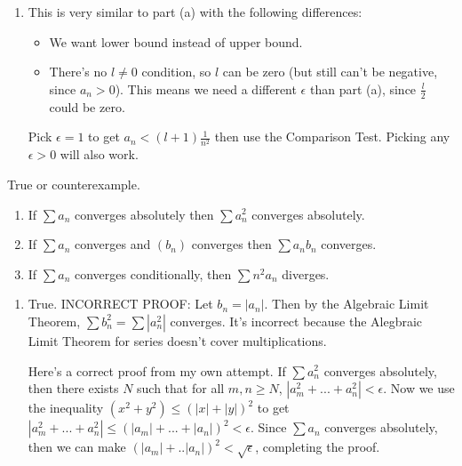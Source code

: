 \documentclass{oxmathproblems}
\begin{document}
\begin{questions}
\begin{solution}
\begin{enumerate}[label=(\alph*)]
    So we've proved that there exists $N$ such that for all $n \geq N$, $(a_{n})$ eventually becomes a constant multiple of the harmonic series. We've also
    satisfied all the conditions for the Comparison Test: $0 \leq (a_{n}) < (\frac{l}{2})(\frac{1}{n})$ and we know that the RHS diverges, so $\sum (a_{n})$ diverges.
  
    \item This is very similar to part (a) with the following differences:
    \begin{itemize}
      \item We want lower bound instead of upper bound.
      \item There's no $l \neq 0$ condition, so $l$ can be zero (but still can't be negative, since $a_{n} > 0$). This means we need a different $\epsilon$ than part (a),
      since $\frac{l}{2}$ could be zero. 
    \end{itemize}

    Pick $\epsilon = 1$ to get $a_{n} < (l+1)\frac{1}{n^{2}}$ then use the Comparison Test. Picking any $\epsilon > 0$ will also work.
  \end{enumerate}
\end{solution}

\miquestion True or counterexample.
\begin{enumerate}[label=(\alph*)]
  \item If $\sum a_{n}$ converges absolutely then $\sum a_{n}^{2}$ converges absolutely.
  \item If $\sum a_{n}$ converges and $(b_{n})$ converges then $\sum a_{n}b_{n}$ converges.
  \item If $\sum a_{n}$ converges conditionally, then $\sum n^{2}a_{n}$ diverges.
\end{enumerate}

\begin{solution}
  \begin{enumerate}[label=(\alph*)]
    \item True. INCORRECT PROOF: Let $b_{n} = |a_{n}|$. Then by the Algebraic Limit Theorem, $\sum b_{n}^{2} = \sum |a_{n}^{2}|$ converges. It's incorrect because
    the Alegbraic Limit Theorem for series doesn't cover multiplications.

    Here's a correct proof from my own attempt. If $\sum a_{n}^{2}$ converges absolutely, then there exists $N$ such that for all $m, n \geq N$, $|a_{m}^2 + ... + a_{n}^2| < \epsilon$.
    Now we use the inequality $(x^2 + y^2) \leq (|x| + |y|)^{2}$ to get $|a_{m}^2 + ... + a_{n}^2| \leq (|a_{m}| + ... + |a_{n}|)^2 < \epsilon$. Since $\sum a_{n}$ converges absolutely,
    then we can make $(|a_{m}| + .. |a_{n}|)^2 < \sqrt{\epsilon}$, completing the proof.


\end{enumerate}
\end{solution}
\end{questions}
\end{document}
